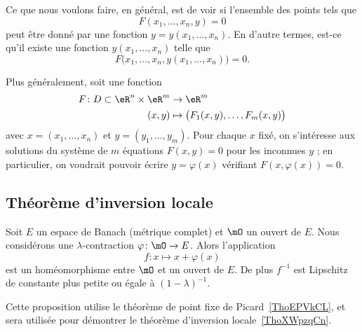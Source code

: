 Ce que nous voulons faire, en général, est de voir si l'ensemble des points tels que
\begin{equation}
    F(x_1,\ldots,x_n,y)=0
\end{equation}
peut être donné par une fonction $y=y(x_1,\ldots,x_n)$. En d'autre termes, est-ce qu'il existe une fonction \( y(x_1,\ldots,x_n)\) telle que
\begin{equation}
    F\big( x_1,\ldots,x_n,y(x_1,\ldots,x_n)\big)=0.
\end{equation}

Plus généralement, soit une fonction
\begin{equation}
    \begin{aligned}
        F\colon D\subset \eR^n\times \eR^m  & \to \eR^m     \\
                            (x,y)           & \mapsto \big( F_1(x,y),\ldots, F_m(x,y) \big)
    \end{aligned}
\end{equation}
avec \( x = (x_1,\ldots, x_n)\) et \( y = (y_1,\ldots,y_m)\). Pour chaque \( x\) fixé, on s'intéresse aux solutions du système de \( m\) équations \( F(x,y) = 0\) pour les inconnues \( y\) ; en particulier, on voudrait pouvoir écrire \( y = \varphi(x)\) vérifiant \( F(x,\varphi(x)) = 0\).

\subsection{Théorème d'inversion locale}

\begin{lemma} \label{LemGZoqknC}
    Soit \( E\) un espace de Banach (métrique complet) et \( \mO\) un ouvert de \( E\). Nous considérons une \( \lambda\)-contraction \( \varphi\colon \mO\to E\). Alors l'application
    \begin{equation}
        f\colon x \mapsto x+\varphi(x)
    \end{equation}
    est un homéomorphisme entre \( \mO\) et un ouvert de \( E\). De plus \( f^{-1}\) est Lipschitz de constante plus petite ou égale à \( (1-\lambda)^{-1}\).
\end{lemma}
Cette proposition utilise le théorème de point fixe de Picard~\ref{ThoEPVkCL}, et sera utilisée pour démontrer le théorème d'inversion locale~\ref{ThoXWpzqCn}.

